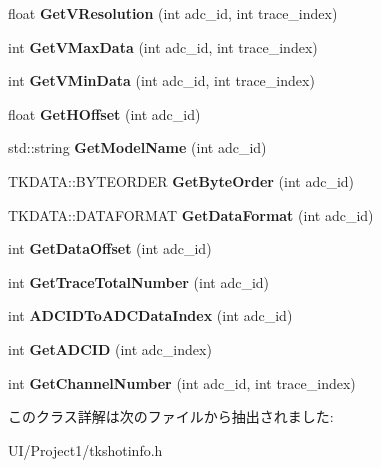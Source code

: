 \begin{DoxyCompactItemize}
float {\bfseries Get\+V\+Resolution} (int adc\+\_\+id, int trace\+\_\+index)
\item 
\mbox{\label{class_t_k_s_h_o_t_aa69c94f494055fd98ff3982681d6795c}} 
int {\bfseries Get\+V\+Max\+Data} (int adc\+\_\+id, int trace\+\_\+index)
\item 
\mbox{\label{class_t_k_s_h_o_t_ab02def889d5bf8c6103dbac2a5f89ab6}} 
int {\bfseries Get\+V\+Min\+Data} (int adc\+\_\+id, int trace\+\_\+index)
\item 
\mbox{\label{class_t_k_s_h_o_t_ae9bd114c4904e0f20929988b4307587f}} 
float {\bfseries Get\+H\+Offset} (int adc\+\_\+id)
\item 
\mbox{\label{class_t_k_s_h_o_t_adb4af221e08781c6f742ff681d134163}} 
std\+::string {\bfseries Get\+Model\+Name} (int adc\+\_\+id)
\item 
\mbox{\label{class_t_k_s_h_o_t_acfcfbf59a93120c97de2eee6acec5104}} 
T\+K\+D\+A\+T\+A\+::\+B\+Y\+T\+E\+O\+R\+D\+ER {\bfseries Get\+Byte\+Order} (int adc\+\_\+id)
\item 
\mbox{\label{class_t_k_s_h_o_t_a30ef4f11ad37a0e1ab3002d6e7a335d6}} 
T\+K\+D\+A\+T\+A\+::\+D\+A\+T\+A\+F\+O\+R\+M\+AT {\bfseries Get\+Data\+Format} (int adc\+\_\+id)
\item 
\mbox{\label{class_t_k_s_h_o_t_ace4770ac6dcdec71ce95823689a58380}} 
int {\bfseries Get\+Data\+Offset} (int adc\+\_\+id)
\item 
\mbox{\label{class_t_k_s_h_o_t_a45a19a71b5d82762601acef738ad504d}} 
int {\bfseries Get\+Trace\+Total\+Number} (int adc\+\_\+id)
\item 
\mbox{\label{class_t_k_s_h_o_t_a370000c7133ee68afe584d7c74864411}} 
int {\bfseries A\+D\+C\+I\+D\+To\+A\+D\+C\+Data\+Index} (int adc\+\_\+id)
\item 
\mbox{\label{class_t_k_s_h_o_t_a5402cb531f82fe70ba46a4f0d97dfedf}} 
int {\bfseries Get\+A\+D\+C\+ID} (int adc\+\_\+index)
\item 
\mbox{\label{class_t_k_s_h_o_t_a71522d246c17a4643838a01bef2943ff}} 
int {\bfseries Get\+Channel\+Number} (int adc\+\_\+id, int trace\+\_\+index)
\end{DoxyCompactItemize}


このクラス詳解は次のファイルから抽出されました\+:\begin{DoxyCompactItemize}
\item 
U\+I/\+Project1/tkshotinfo.\+h\end{DoxyCompactItemize}

